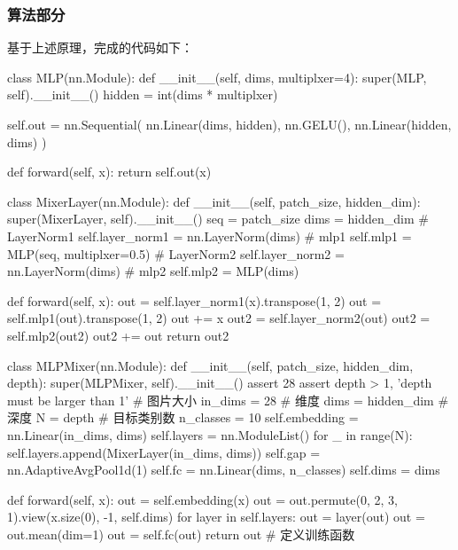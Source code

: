 \documentclass{ctexart}
\begin{document}
\subsubsection{\hei 算法部分}
基于上述原理，完成的代码如下：
\begin{python}
class MLP(nn.Module):
    def __init__(self, dims, multiplxer=4):
        super(MLP, self).__init__()
        hidden = int(dims * multiplxer)

        self.out = nn.Sequential(
            nn.Linear(dims, hidden),
            nn.GELU(),
            nn.Linear(hidden, dims)
        )

    def forward(self, x):
        return self.out(x)


class MixerLayer(nn.Module):
    def __init__(self, patch_size, hidden_dim):
        super(MixerLayer, self).__init__()
        seq = patch_size
        dims = hidden_dim
        # LayerNorm1
        self.layer_norm1 = nn.LayerNorm(dims)
        # mlp1
        self.mlp1 = MLP(seq, multiplxer=0.5)
        # LayerNorm2
        self.layer_norm2 = nn.LayerNorm(dims)
        # mlp2
        self.mlp2 = MLP(dims)

    def forward(self, x):
        out = self.layer_norm1(x).transpose(1, 2)
        out = self.mlp1(out).transpose(1, 2)
        out += x
        out2 = self.layer_norm2(out)
        out2 = self.mlp2(out2)
        out2 += out
        return out2


class MLPMixer(nn.Module):
    def __init__(self, patch_size, hidden_dim, depth):
        super(MLPMixer, self).__init__()
        assert 28 %
        assert depth > 1, 'depth must be larger than 1'
        # 图片大小
        in_dims = 28
        # 维度
        dims = hidden_dim
        # 深度
        N = depth
        # 目标类别数
        n_classes = 10
        self.embedding = nn.Linear(in_dims, dims)
        self.layers = nn.ModuleList()
        for _ in range(N):
            self.layers.append(MixerLayer(in_dims, dims))
        self.gap = nn.AdaptiveAvgPool1d(1)
        self.fc = nn.Linear(dims, n_classes)
        self.dims = dims

    def forward(self, x):
        out = self.embedding(x)
        out = out.permute(0, 2, 3, 1).view(x.size(0), -1, self.dims)
        for layer in self.layers:
            out = layer(out)
        out = out.mean(dim=1)
        out = self.fc(out)
        return out
# 定义训练函数



\end{python}
\end{document}
